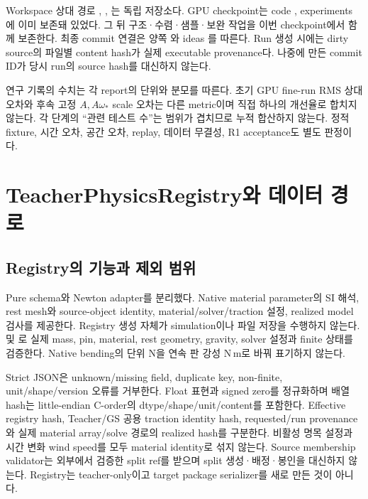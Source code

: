 \documentclass[10pt]{article}
\begin{document}
Workspace 상대 경로 , , 는 독립 저장소다.
GPU checkpoint는 code , experiments 에 이미 보존돼 있었다.
그 뒤 구조·수렴·샘플·보완 작업을 이번 checkpoint에서 함께 보존한다.
최종 commit 연결은 양쪽 와
ideas 를 따른다.
Run 생성 시에는 dirty source의 파일별 content hash가 실제 executable provenance다.
나중에 만든 commit ID가 당시 run의 source hash를 대신하지 않는다.

연구 기록의 수치는 각 report의 단위와 분모를 따른다. 초기 GPU fine-run RMS 상대 오차와
후속 고정 \(A,A\omega_*\) scale 오차는 다른 metric이며 직접 하나의 개선율로 합치지 않는다.
각 단계의 ``관련 테스트 수''는 범위가 겹치므로 누적 합산하지 않는다.
정적 fixture, 시간 오차, 공간 오차, replay, 데이터 무결성, R1 acceptance도 별도 판정이다.

\section{TeacherPhysicsRegistry와 데이터 경로}

\subsection{Registry의 기능과 제외 범위}

Pure schema와 Newton adapter를 분리했다. Native material parameter의 SI 해석, rest mesh와
source-object identity, material/solver/traction 설정, realized model 검사를 제공한다.
Registry 생성 자체가 simulation이나 파일 저장을 수행하지 않는다.
 및 로 실제 mass, pin,
material, rest geometry, gravity, solver 설정과 finite 상태를 검증한다.
Native bending의 단위 N을 연속 판 강성 N\,m로 바꿔 표기하지 않는다.

Strict JSON은 unknown/missing field, duplicate key, non-finite, unit/shape/version 오류를 거부한다.
Float 표현과 signed zero를 정규화하며 배열 hash는 little-endian C-order의 dtype/shape/unit/content를
포함한다. Effective registry hash, Teacher/GS 공용 traction identity hash, requested/run provenance와
실제 material array/solve 경로의 realized hash를 구분한다.
비활성 명목 설정과 시간 변화 wind speed를 모두 material identity로 섞지 않는다.
Source membership validator는 외부에서 검증한 split ref를 받으며 split 생성·배정·봉인을 대신하지 않는다.
Registry는 teacher-only이고 target package serializer를 새로 만든 것이 아니다.
\end{document}
